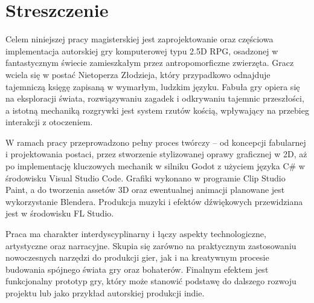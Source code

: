 
\section*{Streszczenie} 
Celem niniejszej pracy magisterskiej jest zaprojektowanie oraz częściowa implementacja autorskiej gry komputerowej typu 2.5D RPG, osadzonej w fantastycznym świecie zamieszkałym przez antropomorficzne zwierzęta. Gracz wciela się w postać Nietoperza Złodzieja, który przypadkowo odnajduje tajemniczą księgę zapisaną w wymarłym, ludzkim języku. Fabuła gry opiera się na eksploracji świata, rozwiązywaniu zagadek i odkrywaniu tajemnic przeszłości, a istotną mechaniką rozgrywki jest system rzutów kością, wpływający na przebieg interakcji z otoczeniem.

W ramach pracy przeprowadzono pełny proces twórczy – od koncepcji fabularnej i projektowania postaci, przez stworzenie stylizowanej oprawy graficznej w 2D, aż po implementację kluczowych mechanik w silniku Godot z użyciem języka C\# w środowisku Visual Studio Code. Grafiki wykonano w programie Clip Studio Paint, a do tworzenia assetów 3D oraz ewentualnej animacji planowane jest wykorzystanie Blendera. Produkcja muzyki i efektów dźwiękowych przewidziana jest w środowisku FL Studio.

Praca ma charakter interdyscyplinarny i łączy aspekty technologiczne, artystyczne oraz narracyjne. Skupia się zarówno na praktycznym zastosowaniu nowoczesnych narzędzi do produkcji gier, jak i na kreatywnym procesie budowania spójnego świata gry oraz bohaterów. Finalnym efektem jest funkcjonalny prototyp gry, który może stanowić podstawę do dalszego rozwoju projektu lub jako przykład autorskiej produkcji indie.




\cleardoublepage
